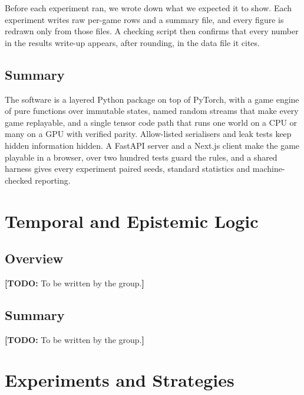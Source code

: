 \documentclass[11pt,a4paper,oneside]{report}
\newcommand{\todo}[1]{\textcolor{todo}{\textbf{[TODO:} #1\textbf{]}}}
\newcommand{\overviewsection}{\section{Overview}}
\newcommand{\summarysection}{\section{Summary}}
\begin{document}
Before each experiment ran, we wrote down what we expected it to show. Each experiment writes raw
per-game rows and a summary file, and every figure is redrawn only from those files. A checking script
then confirms that every number in the results write-up appears, after rounding, in the data file it
cites.

\summarysection

The software is a layered Python package on top of PyTorch, with a game engine of pure functions over
immutable states, named random streams that make every game replayable, and a single tensor code path that
runs one world on a CPU or many on a GPU with verified parity. Allow-listed serialisers and leak tests keep
hidden information hidden. A FastAPI server and a Next.js client make the game playable in a browser, over
two hundred tests guard the rules, and a shared harness gives every experiment paired seeds, standard
statistics and machine-checked reporting.

\chapter{Temporal and Epistemic Logic}\label{ch:logic}

\overviewsection

\todo{To be written by the group.}


\summarysection

\todo{To be written by the group.}

\chapter{Experiments and Strategies}\label{ch:results}
\end{document}
